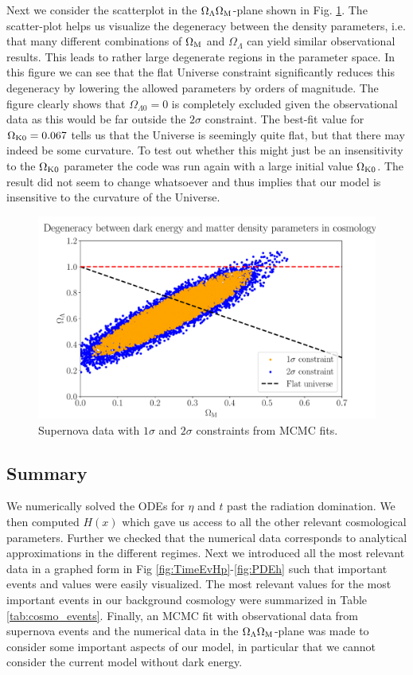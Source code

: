 \documentclass[%
reprint,
 amsmath,amssymb,
 aps,
]{revtex4-2}
\begin{document}
Next we consider the scatterplot in the $\Omega_\Lambda\Omega_\text M$-plane shown in Fig. \ref{fig:scatt}. The scatter-plot helps us visualize the degeneracy between the density parameters, i.e. that many different combinations of $\Omega_\text M$ and $\Omega_{\Lambda}$ can yield similar observational results. This leads to rather large degenerate regions in the parameter space. In this figure we can see that the flat Universe constraint significantly reduces this degeneracy by lowering the allowed parameters by orders of magnitude. The figure clearly shows that $\Omega_{\Lambda0}=0$ is completely excluded given the observational data as this would be far outside the $2\sigma$ constraint. The best-fit value for $\Omega_{\text K0}=0.067$ tells us that the Universe is seemingly quite flat, but that there may indeed be some curvature. To test out whether this might just be an insensitivity to the $\Omega_{\text K0}$ parameter the code was run again with a large initial value $\Omega_{\text K0}$. The result did not seem to change whatsoever and thus implies that our model is insensitive to the curvature of the Universe.
\begin{figure}[ht!]
\includegraphics[width = \linewidth]{Figures/ScattPlot.pdf}
\caption{Supernova data with $1\sigma$ and $2\sigma$ constraints from MCMC fits.}
\label{fig:scatt}
\end{figure}

\subsection{Summary}
We numerically solved the ODEs for $\eta$ and $t$ past the radiation domination. We then computed $H(x)$ which gave us access to all the other relevant cosmological parameters. Further we checked that the numerical data corresponds to analytical approximations in the different regimes. Next we introduced all the most relevant data in a graphed form in Fig \ref{fig:TimeEvHp}-\ref{fig:PDEh} such that important events and values were easily visualized. The most relevant values for the most important events in our background cosmology were summarized in Table \ref{tab:cosmo_events}. Finally, an MCMC fit with observational data from supernova events and the numerical data in the $\Omega_{\Lambda}\Omega_{\text M}$-plane was made to consider some important aspects of our model, in particular that we cannot consider the current model without dark energy. 
\end{document}
